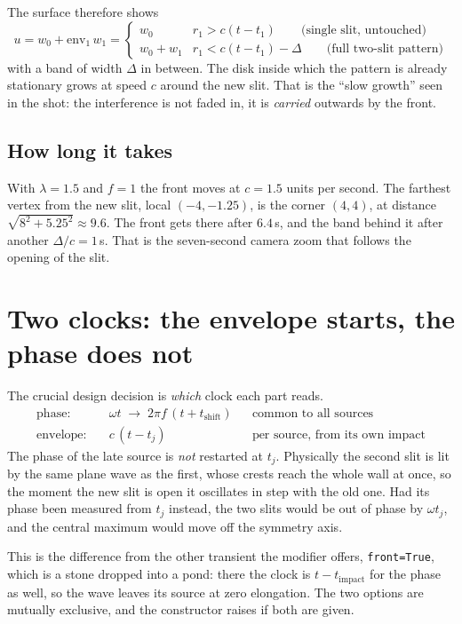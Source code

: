 \documentclass[11pt,a4paper]{article}
\newcommand{\node}[1]{\texttt{#1}}
\begin{document}
The surface therefore shows
\[
  u = w_0 + \mathrm{env}_1\,w_1 =
  \begin{cases}
    w_0 & r_1 > c(t-t_1) \qquad\text{(single slit, untouched)}\\
    w_0 + w_1 & r_1 < c(t-t_1)-\Delta \qquad\text{(full two-slit pattern)}
  \end{cases}
\]
with a band of width $\Delta$ in between. The disk inside which the pattern is
already stationary grows at speed $c$ around the new slit. That is the
``slow growth'' seen in the shot: the interference is not faded in, it is
\emph{carried} outwards by the front.

\subsection*{How long it takes}
With $\lambda=1.5$ and $f=1$ the front moves at $c=1.5$ units per second. The
farthest vertex from the new slit, local $(-4,-1.25)$, is the corner $(4,4)$,
at distance $\sqrt{8^2+5.25^2}\approx 9.6$. The front gets there after
$6.4\,$s, and the band behind it after another $\Delta/c=1\,$s. That is the
seven-second camera zoom that follows the opening of the slit.

\section{Two clocks: the envelope starts, the phase does not}

The crucial design decision is \emph{which} clock each part reads.
\begin{align*}
  \text{phase:}\quad    & \omega t \;\to\; 2\pi f\,(t+t_\text{shift})
                          &&\text{common to all sources}\\
  \text{envelope:}\quad & c\,(t-t_j) &&\text{per source, from its own impact}
\end{align*}
The phase of the late source is \emph{not} restarted at $t_j$. Physically the
second slit is lit by the same plane wave as the first, whose crests reach the
whole wall at once, so the moment the new slit is open it oscillates in step
with the old one. Had its phase been measured from $t_j$ instead, the two
slits would be out of phase by $\omega t_j$, and the central maximum would
move off the symmetry axis.

This is the difference from the other transient the modifier offers,
\node{front=True}, which is a stone dropped into a pond: there the clock is
$t-t_\text{impact}$ for the phase as well, so the wave leaves its source at zero
elongation. The two options are mutually exclusive, and the constructor
raises if both are given.
\end{document}
